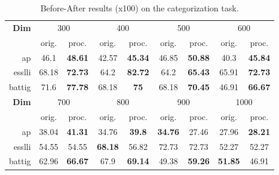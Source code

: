 \documentclass{article} \usepackage{acl2017,times}
\begin{document}
\begin{table}[!h]
\centering
\begin{tabular}{|r|c|c|c|c|c|c|c|c|}
\hline
\multirow{2}{*}{\bf Dim} & \multicolumn{2}{c|}{300} & \multicolumn{2}{c|}{400}        & \multicolumn{2}{c|}{500}        & \multicolumn{2}{c|}{600}        \\ \cline{2-9} 
                         & orig.  & proc.           & orig.          & proc.          & orig.          & proc.          & orig.          & proc.          \\ \hline
ap                       & 46.1   & \textbf{48.61}  & 42.57          & \textbf{45.34} & 46.85          & \textbf{50.88} & 40.3           & \textbf{45.84} \\ \hline
esslli                   & 68.18  & \textbf{72.73}  & 64.2           & \textbf{82.72} & 64.2           & \textbf{65.43} & 65.91          & \textbf{72.73} \\ \hline
battig                   & 71.6   & \textbf{77.78}  & 68.18          & \textbf{75}    & 68.18          & \textbf{70.45} & 46.91          & \textbf{66.67} \\ \hline
\multirow{2}{*}{\bf Dim} & \multicolumn{2}{c|}{700} & \multicolumn{2}{c|}{800}        & \multicolumn{2}{c|}{900}        & \multicolumn{2}{c|}{1000}       \\ \cline{2-9} 
                         & orig.  & proc.           & orig.          & proc.          & orig.          & proc.          & orig.          & proc.          \\ \hline
ap                       & 38.04  & \textbf{41.31}  & 34.76          & \textbf{39.8}  & \textbf{34.76} & 27.46          & 27.96          & \textbf{28.21} \\ \hline
esslli                   & 54.55  & 54.55           & \textbf{68.18} & 56.82          & 72.73          & 72.73          & 52.27          & 52.27          \\ \hline
battig                   & 62.96  & \textbf{66.67}  & 67.9           & \textbf{69.14} & 49.38          & \textbf{59.26} & \textbf{51.85} & 46.91          \\ \hline
\end{tabular}
\caption{Before-After results (x100) on the categorization task.}
\label{tb:high-dim-categorization}
\end{table}
\end{document}

